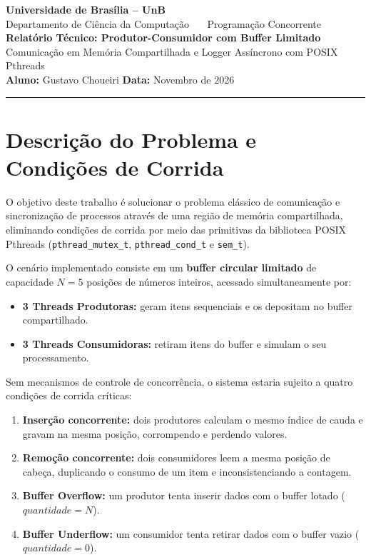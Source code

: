 \documentclass[11pt, a4paper]{article}
\begin{document}
\begin{center}
    {\large \textbf{Universidade de Brasília -- UnB}}\\[2pt]
    {\normalsize Departamento de Ciência da Computação \ \textbar\ \ Programação Concorrente}\\[6pt]
    {\Large \textbf{Relatório Técnico: Produtor-Consumidor com Buffer Limitado}}\\[3pt]
    {\large Comunicação em Memória Compartilhada e Logger Assíncrono com POSIX Pthreads}\\[8pt]
    {\textbf{Aluno:} Gustavo Choueiri \qquad \textbf{Data:} Novembro de 2026}
\end{center}
\vspace{-0.1cm}
\hrule
\vspace{0.3cm}

\section{Descrição do Problema e Condições de Corrida}

O objetivo deste trabalho é solucionar o problema clássico de comunicação e sincronização de processos através de uma região de memória compartilhada, eliminando condições de corrida por meio das primitivas da biblioteca POSIX Pthreads (\texttt{pthread\_mutex\_t}, \texttt{pthread\_cond\_t} e \texttt{sem\_t}).

O cenário implementado consiste em um \textbf{buffer circular limitado} de capacidade $N = 5$ posições de números inteiros, acessado simultaneamente por:
\begin{itemize}\setlength{\itemsep}{0pt}\setlength{\parskip}{0pt}
    \item \textbf{3 Threads Produtoras:} geram itens sequenciais e os depositam no buffer compartilhado.
    \item \textbf{3 Threads Consumidoras:} retiram itens do buffer e simulam o seu processamento.
\end{itemize}

Sem mecanismos de controle de concorrência, o sistema estaria sujeito a quatro condições de corrida críticas:
\begin{enumerate}\setlength{\itemsep}{0pt}\setlength{\parskip}{0pt}
    \item \textbf{Inserção concorrente:} dois produtores calculam o mesmo índice de cauda e gravam na mesma posição, corrompendo e perdendo valores.
    \item \textbf{Remoção concorrente:} dois consumidores leem a mesma posição de cabeça, duplicando o consumo de um item e inconsistenciando a contagem.
    \item \textbf{Buffer Overflow:} um produtor tenta inserir dados com o buffer lotado ($quantidade = N$).
    \item \textbf{Buffer Underflow:} um consumidor tenta retirar dados com o buffer vazio ($quantidade = 0$).
\end{enumerate}
\end{document}
